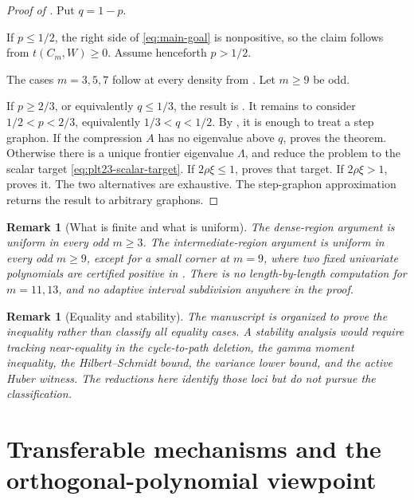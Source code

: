 \documentclass[11pt]{article}
\newtheorem{remark}[theorem]{Remark}
\numberwithin{equation}{section}
\begin{document}
\begin{proof}[Proof of ]
  Put $q=1-p$.

  If $p\le1/2$, the right side of \eqref{eq:main-goal} is nonpositive, so the
  claim follows from $t(C_m,W)\ge0$.  Assume henceforth $p>1/2$.

  The cases $m=3,5,7$ follow at every density from
  .  Let $m\ge9$ be odd.

  If $p\ge2/3$, or equivalently $q\le1/3$, the result is
  .  It remains to consider
  $1/2<p<2/3$, equivalently $1/3<q<1/2$.
  By , it is enough to treat a step graphon.  If the
  compression $A$ has no eigenvalue above $q$,
   proves the theorem.  Otherwise there is a unique
  frontier eigenvalue $\Lambda$, and
   reduce the problem to the scalar
  target \eqref{eq:plt23-scalar-target}.  If $2\rho\xi\le1$,
   proves that target.  If $2\rho\xi>1$,
   proves it.  The two alternatives are exhaustive.
  The step-graphon approximation returns the result to arbitrary graphons.
\end{proof}

\begin{remark}[What is finite and what is uniform]
  The dense-region argument is uniform in every odd $m\ge3$.  The
  intermediate-region argument is uniform in every odd $m\ge9$, except for a
  small corner at $m=9$, where two fixed univariate polynomials are certified
  positive in .  There is no length-by-length computation
  for $m=11,13$, and no adaptive interval subdivision anywhere in the proof.
\end{remark}

\begin{remark}[Equality and stability]
  The manuscript is organized to prove the inequality rather than classify all
  equality cases.  A stability analysis would require tracking near-equality
  in the cycle-to-path deletion, the gamma moment inequality, the
  Hilbert--Schmidt bound, the variance lower bound, and the active Huber
  witness.  The reductions here identify those loci but do not pursue the
  classification.
\end{remark}

\section{Transferable mechanisms and the orthogonal-polynomial viewpoint}
\label{sec:transferable}
\end{document}
